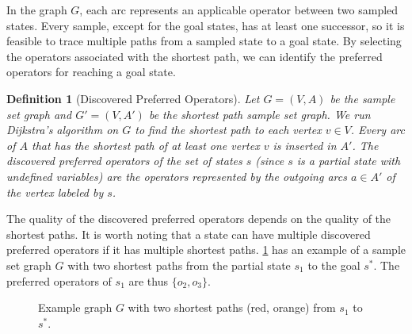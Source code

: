 \documentclass[ppgc,diss,english]{iiufrgs}
\newtheorem{definition}{Definition}
\begin{document}
In the graph $G$, each arc represents an applicable operator between two sampled states. Every sample, except for the goal states, has at least one successor, so it is feasible to trace multiple paths from a sampled state to a goal state. By selecting the operators associated with the shortest path, we can identify the preferred operators for reaching a goal state.

\begin{definition}[Discovered Preferred Operators]\label{def:discovered_preferred_operators}
Let $G = (V, A)$ be the sample set graph and $G' = (V, A')$ be the shortest path sample set graph. We run Dijkstra's algorithm on $G$ to find the shortest path to each vertex $v \in V$. Every arc of $A$ that has the shortest path of at least one vertex $v$ is inserted in $A'$. The discovered preferred operators of the set of states $s$ (since $s$ is a partial state with undefined variables) are the operators represented by the outgoing arcs $a \in A'$ of the vertex labeled by $s$.
\end{definition}

The quality of the discovered preferred operators depends on the quality of the shortest paths. It is worth noting that a state can have multiple discovered preferred operators if it has multiple shortest paths. \cref{fig:spg-example} has an example of a sample set graph $G$ with two shortest paths from the partial state $s_{1}$ to the goal $s^{*}$. The preferred operators of $s_{1}$ are thus $\{o_{2}, o_{3}\}$.

\begin{figure}[tb]
\caption[Example graph $G'$ with two shortest paths]{Example graph $G$ with two shortest paths (red, orange) from $s_{1}$ to $s^{*}$.}
\centering
{}
\label{fig:spg-example}
\end{figure}
\end{document}
